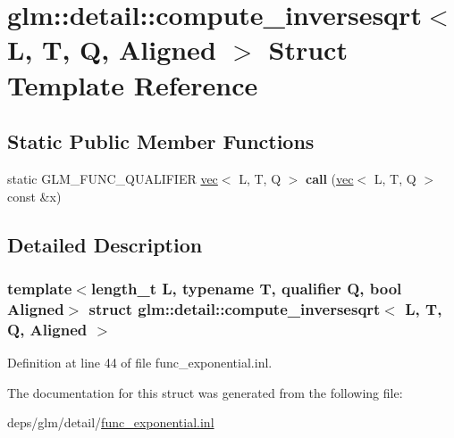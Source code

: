 \hypertarget{structglm_1_1detail_1_1compute__inversesqrt}{}\section{glm\+:\+:detail\+:\+:compute\+\_\+inversesqrt$<$ L, T, Q, Aligned $>$ Struct Template Reference}
\label{structglm_1_1detail_1_1compute__inversesqrt}
\subsection*{Static Public Member Functions}
\begin{DoxyCompactItemize}
\item 
\mbox{\label{structglm_1_1detail_1_1compute__inversesqrt_a561ccd247f02dcc4b10254e7f841333c}} 
static G\+L\+M\+\_\+\+F\+U\+N\+C\+\_\+\+Q\+U\+A\+L\+I\+F\+I\+ER \hyperlink{structglm_1_1vec}{vec}$<$ L, T, Q $>$ {\bfseries call} (\hyperlink{structglm_1_1vec}{vec}$<$ L, T, Q $>$ const \&x)
\end{DoxyCompactItemize}


\subsection{Detailed Description}
\subsubsection*{template$<$length\+\_\+t L, typename T, qualifier Q, bool Aligned$>$\newline
struct glm\+::detail\+::compute\+\_\+inversesqrt$<$ L, T, Q, Aligned $>$}



Definition at line 44 of file func\+\_\+exponential.\+inl.



The documentation for this struct was generated from the following file\+:\begin{DoxyCompactItemize}
\item 
deps/glm/detail/\hyperlink{func__exponential_8inl}{func\+\_\+exponential.\+inl}\end{DoxyCompactItemize}
